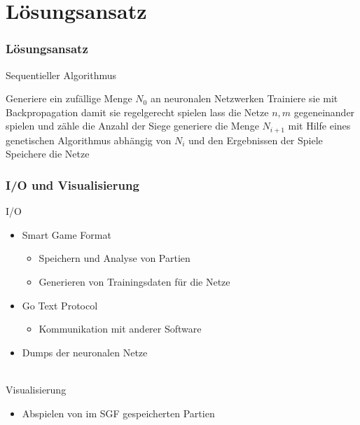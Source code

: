 \documentclass[compress]{beamer}
\begin{document}
\section{Lösungsansatz}
\begin{frame}
    \frametitle{Lösungsansatz}

    Sequentieller Algorithmus
    \begin{algorithm}[H]
        \begin{algorithmic}[1]
            \State Generiere ein zufällige Menge $N_0$ an neuronalen Netzwerken
            \State Trainiere sie mit Backpropagation damit sie regelgerecht spielen
                    \State lass die Netze $n, m$ gegeneinander spielen
                    \State und zähle die Anzahl der Siege
                \EndFor
                \State generiere die Menge $N_{i+1}$ mit Hilfe eines genetischen
                Algorithmus abhängig von $N_i$ und den Ergebnissen der Spiele
            \EndFor
            \State Speichere die Netze
        \end{algorithmic}
    \end{algorithm}
\end{frame}
\begin{frame}
    \frametitle{I/O und Visualisierung}

    I/O
    \begin{itemize}
        \item Smart Game Format
            \begin{itemize}
                \item Speichern und Analyse von Partien
                \item Generieren von Trainingsdaten für die Netze
            \end{itemize}
        \item Go Text Protocol
            \begin{itemize}
                \item Kommunikation mit anderer Software
            \end{itemize}
        \item Dumps der neuronalen Netze
    \end{itemize}
    
    \hfill \\
    Visualisierung
    \begin{itemize}
        \item Abspielen von im SGF gespeicherten Partien
    \end{itemize}

\end{frame}
\end{document}
